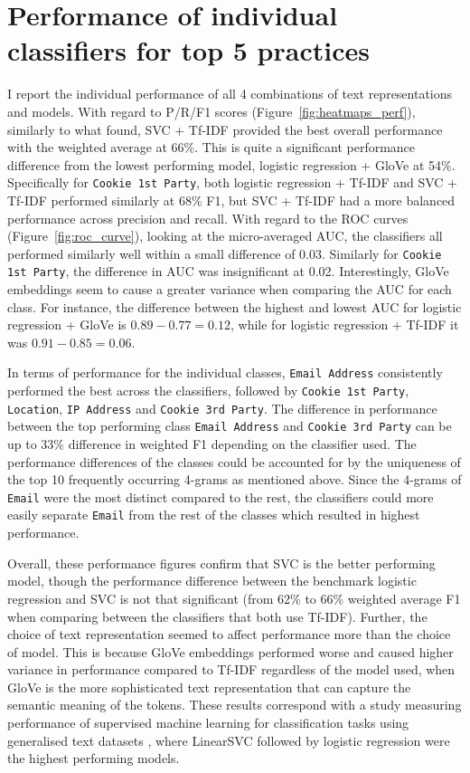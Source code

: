 \section{Performance of individual classifiers for top 5 practices}
I report the individual performance of all 4 combinations of text representations and models. With regard to P/R/F1 scores (Figure~\ref{fig:heatmaps_perf}), similarly to what \cite{zimmeck2019} found, SVC + Tf-IDF provided the best overall performance with the weighted average at 66\%. This is quite a significant performance difference from the lowest performing model, logistic regression + GloVe at 54\%. Specifically for \texttt{Cookie 1st Party}, both logistic regression + Tf-IDF and SVC + Tf-IDF performed similarly at 68\% F1, but SVC + Tf-IDF had a more balanced performance across precision and recall. With regard to the ROC curves (Figure~\ref{fig:roc_curve}), looking at the micro-averaged AUC, the classifiers all performed similarly well within a small difference of 0.03. Similarly for \texttt{Cookie 1st Party}, the difference in AUC was insignificant at 0.02. Interestingly, GloVe embeddings seem to cause a greater variance when comparing the AUC for each class. For instance, the difference between the highest and lowest AUC for logistic regression + GloVe is $0.89 - 0.77 = 0.12$, while for logistic regression + Tf-IDF it was $0.91 - 0.85 = 0.06$.

In terms of performance for the individual classes, \texttt{Email Address} consistently performed the best across the classifiers, followed by \texttt{Cookie 1st Party}, \texttt{Location}, \texttt{IP Address} and \texttt{Cookie 3rd Party}. The difference in performance between the top performing class \texttt{Email Address} and \texttt{Cookie 3rd Party} can be up to 33\% difference in weighted F1 depending on the classifier used. The performance differences of the classes could be accounted for by the uniqueness of the top 10 frequently occurring 4-grams as mentioned above. Since the 4-grams of \texttt{Email} were the most distinct compared to the rest, the classifiers could more easily separate \texttt{Email} from the rest of the classes which resulted in highest performance.

Overall, these performance figures confirm that SVC is the better performing model, though the performance difference between the benchmark logistic regression and SVC is not that significant (from 62\% to 66\% weighted average F1 when comparing between the classifiers that both use Tf-IDF). Further, the choice of text representation seemed to affect performance more than the choice of model. This is because GloVe embeddings performed worse and caused higher variance in performance compared to Tf-IDF regardless of the model used, when GloVe is the more sophisticated text representation that can capture the semantic meaning of the tokens. These results correspond with a study measuring performance of supervised machine learning for classification tasks using generalised text datasets \cite{hsu2020}, where LinearSVC followed by logistic regression were the highest performing models. 


